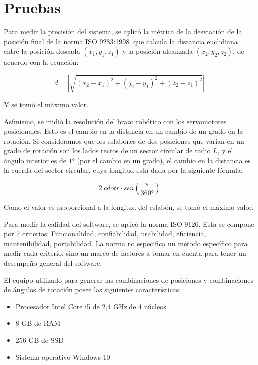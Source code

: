 \section{Pruebas}

Para medir la precisión del sistema, se aplicó la métrica de la desviación de la posición final de la norma ISO 9283:1998, que calcula la distancia euclidiana entre la posición deseada $(x_1, y_1, z_1)$ y la posición alcanzada $(x_2, y_2, z_2)$, de acuerdo con la ecuación:

\begin{equation}
	d = |\sqrt{(x_2 - x_1)^2 + (y_2 - y_1)^2 + (z_2 - z_1)^2}|
\end{equation}

Y se tomó el máximo valor.

Asímismo, se midió la resolución del brazo robótico con los servomotores posicionales. Esto es el cambio en la distancia en un cambio de un grado en la rotación. Si consideramos que los eslabones de dos posiciones que varían en un grado de rotación son los lados rectos de un sector circular de radio $L$, y el ángulo interior es de $1°$ (por el cambio en un grado), el cambio en la distancia es la cuerda del sector circular, cuya longitud está dada por la siguiente fórmula:

\begin{equation}
	2 \ cdot r \cdot sen(\frac{\pi}{360°})
\end{equation}

Como el valor es proporcional a la longitud del eslabón, se tomó el máximo valor. 

Para medir la calidad del software, se aplicó la norma ISO 9126. Esta se compone por 7 criterios: Funcionalidad, confiabilidad, usabilidad, eficiencia, mantenibilidad, portabilidad. La norma no especifica un método específico para medir cada criterio, sino un marco de factores a tomar en cuenta para tener un desempeño general del software. 

El equipo utilizado para generar las combinaciones de posiciones y combinaciones de ángulos de rotación posee las siguientes características:

\begin{itemize}
	\item Procesador Intel Core i5 de 2,4 GHz de 4 núcleos
	\item 8 GB de RAM
	\item 256 GB de SSD
	\item Sistema operativo Windows 10
\end{itemize}